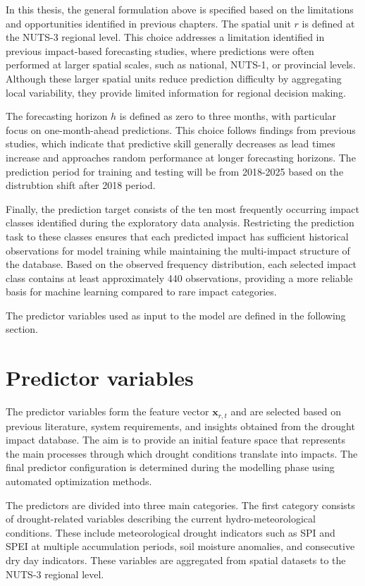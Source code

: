 In this thesis, the general formulation above is specified based on the limitations and opportunities identified in previous chapters. The spatial unit $r$ is defined at the NUTS-3 regional level. This choice addresses a limitation identified in previous impact-based forecasting studies, where predictions were often performed at larger spatial scales, such as national, NUTS-1, or provincial levels. Although these larger spatial units reduce prediction difficulty by aggregating local variability, they provide limited information for regional decision making.

The forecasting horizon $h$ is defined as zero to three months, with particular focus on one-month-ahead predictions. This choice follows findings from previous studies, which indicate that predictive skill generally decreases as lead times increase and approaches random performance at longer forecasting horizons. The prediction period for training and testing will be from 2018-2025 based on the distrubtion shift after 2018 period. 

Finally, the prediction target consists of the ten most frequently occurring impact classes identified during the exploratory data analysis. Restricting the prediction task to these classes ensures that each predicted impact has sufficient historical observations for model training while maintaining the multi-impact structure of the database. Based on the observed frequency distribution, each selected impact class contains at least approximately 440 observations, providing a more reliable basis for machine learning compared to rare impact categories.

The predictor variables used as input to the model are defined in the following section.


\section{Predictor variables}

The predictor variables form the feature vector $\mathbf{x}_{r,t}$ and are selected based on previous literature, system requirements, and insights obtained from the drought impact database. The aim is to provide an initial feature space that represents the main processes through which drought conditions translate into impacts. The final predictor configuration is determined during the modelling phase using automated optimization methods.

The predictors are divided into three main categories. The first category consists of drought-related variables describing the current hydro-meteorological conditions. These include meteorological drought indicators such as SPI and SPEI at multiple accumulation periods, soil moisture anomalies, and consecutive dry day indicators. These variables are aggregated from spatial datasets to the NUTS-3 regional level.

